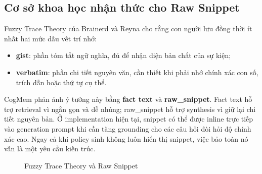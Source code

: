 \documentclass[../main.tex]{subfiles}
\begin{document}
\subsection{Cơ sở khoa học nhận thức cho Raw Snippet}

Fuzzy Trace Theory của Brainerd và Reyna cho rằng con người lưu đồng thời ít nhất hai mức dấu vết trí nhớ:
\begin{itemize}
    \item \textbf{gist}: phần tóm tắt ngữ nghĩa, đủ để nhận diện bản chất của sự kiện;
    \item \textbf{verbatim}: phần chi tiết nguyên văn, cần thiết khi phải nhớ chính xác con số, trích dẫn hoặc thứ tự cụ thể.
\end{itemize}

CogMem phản ánh ý tưởng này bằng \textbf{fact text} và \textbf{raw\_snippet}. Fact text hỗ trợ retrieval vì ngắn gọn và dễ nhúng; raw\_snippet hỗ trợ synthesis vì giữ lại chi tiết nguyên bản. Ở implementation hiện tại, snippet có thể được inline trực tiếp vào generation prompt khi cần tăng grounding cho các câu hỏi đòi hỏi độ chính xác cao. Ngay cả khi policy sinh không luôn hiển thị snippet, việc bảo toàn nó vẫn là một yêu cầu kiến trúc.

\begin{figure}[H]
\centering
{}
\caption{Fuzzy Trace Theory và Raw Snippet}
\label{fig:ch4_fuzzy_trace}
\end{figure}
\end{document}
